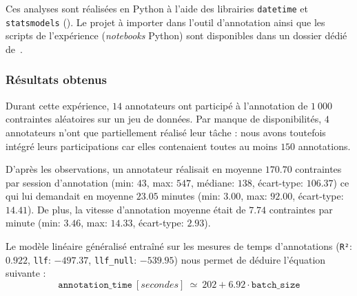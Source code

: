 			\begin{leftBarInformation}
				Ces analyses sont réalisées en Python à l'aide des librairies \texttt{datetime} et \texttt{statsmodels} (\cite{seabold:2010}).
				Le projet à importer dans l'outil d'annotation ainsi que les scripts de l'expérience (\textit{notebooks} Python) sont disponibles dans un dossier dédié de~\cite{schild:cognitivefactory-interactive-clustering-comparative-study:2021}.
			\end{leftBarInformation}

		\subsubsection{Résultats obtenus}
		
			Durant cette expérience, $14$ annotateurs ont participé à l'annotation de $1~000$ contraintes aléatoires sur un jeu de données.
			Par manque de disponibilités, $4$ annotateurs n'ont que partiellement réalisé leur tâche : nous avons toutefois intégré leurs participations car elles contenaient toutes au moins $150$ annotations.
			
			D'après les observations, un annotateur réalisait en moyenne $170.70$ contraintes par session d'annotation (min: $43$, max: $547$, médiane: $138$, écart-type: $106.37$) ce qui lui demandait en moyenne $23.05$ minutes (min: $3.00$, max: $92.00$, écart-type: $14.41$).
			De plus, la vitesse d'annotation moyenne était de $7.74$ contraintes par minute (min: $3.46$, max: $14.33$, écart-type: $2.93$).
			
			Le modèle linéaire généralisé entraîné sur les mesures de temps d'annotations (\texttt{R²}: $0.922$, \texttt{llf}: $-497.37$, \texttt{llf\_null}: $-539.95$) nous permet de déduire l'équation suivante :
			\begin{equation}
				\texttt{annotation\_time}~[secondes]~
				\simeq~202 + 6.92 \cdot \texttt{batch\_size}
			\end{equation}
		
